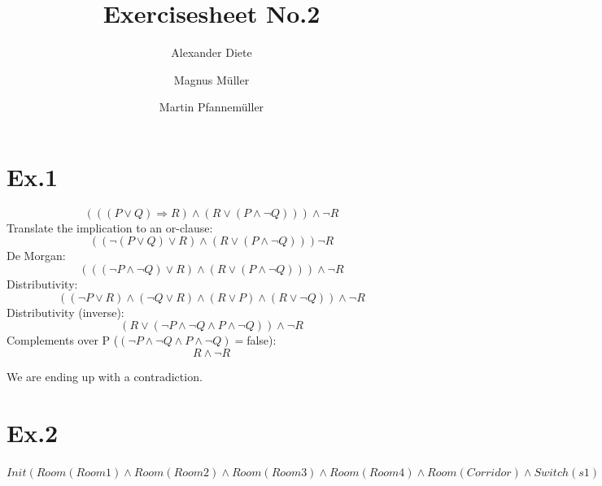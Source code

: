 \documentclass[11pt]{article}
\title{Exercisesheet No.2}
\author{Alexander Diete \and Magnus M\"uller \and Martin Pfannem\"uller}
\begin{document}
\maketitle
\section*{Ex.1}
$$(((P \vee Q) \Rightarrow R) \wedge (R \vee (P \wedge \neg Q))) \wedge \neg R$$
Translate the implication to an or-clause:
$$((\neg(P \vee Q) \vee R) \wedge (R \vee (P \wedge \neg Q))) \neg R$$
De Morgan:
$$(((\neg P \wedge \neg Q) \vee R) \wedge (R \vee (P \wedge \neg Q))) \wedge \neg R$$
Distributivity:
$$((\neg P \vee R) \wedge (\neg Q \vee R) \wedge (R \vee P) \wedge (R \vee \neg Q))\wedge \neg R$$
Distributivity (inverse):
$$(R \vee (\neg P \wedge \neg Q \wedge P \wedge \neg Q))\wedge \neg R$$
Complements over P ($(\neg P \wedge \neg Q \wedge P \wedge \neg Q) = $false):
$$R \wedge \neg R$$

We are ending up with a contradiction.

\section*{Ex.2}

$\displaystyle Init(Room(Room1) \wedge Room(Room2) \wedge Room(Room3) \wedge Room(Room4) \wedge Room(Corridor) \wedge Switch(s1) \wedge Switch(s2) \wedge Switch(s3) \wedge Switch(s4) \wedge Box(b1) \wedge Box(b2) \wedge Box(b3) \wedge Box(b4) \wedge Door(Door1) \wedge Door(Door2) \wedge Door(Door3) \wedge Door(Door4) \wedge At(Shakey,Floor) \wedge In(Shakey,Room3) \wedge TurnedOn(s4) \wedge TurnedOff(s3) \wedge TurnedOff(s2) \wedge TurnedOn(s1) \wedge In(b1,Room1) \wedge In(b2,Room1) \wedge In(b3,Room1) \wedge In(b4,Room1) \wedge At(s1,Room1) \wedge At(s2,Room2) \wedge At(s3,Room3) \wedge At(s4,Room4) \wedge In(Door1,Room1) \wedge In(Door1,Corridor) \wedge In(Door2,Room2) \wedge In(Door2,Corridor) \wedge In(Door3,Room3) \wedge In(Door3,Corridor) \wedge In(Door4,Room4) \wedge In(Door4,Corridor))$
\end{document}
